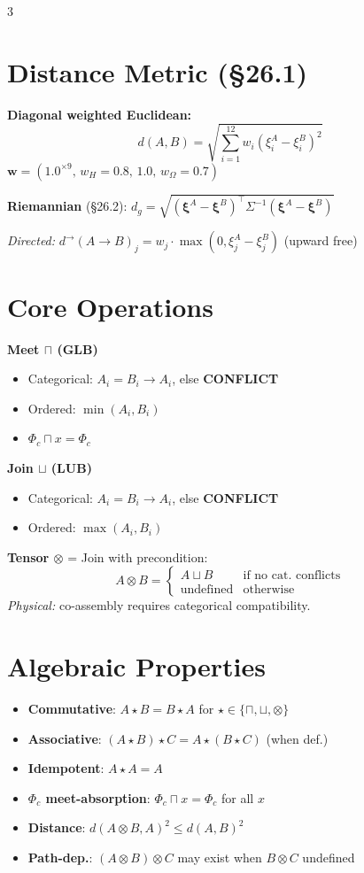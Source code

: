 \documentclass[8pt,a4paper,landscape]{article}
\newcommand{\spec}[1]{\textcolor{specpurple}{#1}}
\newcommand{\conf}{\textcolor{confred}{\textbf{CONFLICT}}}
\begin{document}
\begin{multicols}{3}
\section*{Distance Metric (\S26.1)}
\footnotesize
\textbf{Diagonal weighted Euclidean:}
$$d(A,B)=\sqrt{\sum_{i=1}^{12}w_i(\xi_i^A-\xi_i^B)^2}$$
$\mathbf{w}=(1.0^{\times 9},\,w_H{=}0.8,\,1.0,\,w_\Omega{=}0.7)$

\vspace{0.5em}
\textbf{Riemannian} (\S26.2): $d_g=\sqrt{(\boldsymbol{\xi}^A-\boldsymbol{\xi}^B)^\top\Sigma^{-1}(\boldsymbol{\xi}^A-\boldsymbol{\xi}^B)}$

\textit{Directed:} $d^\to(A\to B)_j = w_j\cdot\max(0,\xi_j^A-\xi_j^B)$ (upward free)

\section*{Core Operations}
\footnotesize
\textbf{Meet $\sqcap$ (GLB)}
\begin{itemize}[leftmargin=*,nosep,label={},topsep=4pt,itemsep=2pt]
\item Categorical: $A_i=B_i\to A_i$, else \conf
\item Ordered: $\min(A_i,B_i)$
\item \spec{$\Phi_c\sqcap x=\Phi_c$}
\end{itemize}

\textbf{Join $\sqcup$ (LUB)}
\begin{itemize}[leftmargin=*,nosep,label={},topsep=4pt,itemsep=2pt]
\item Categorical: $A_i=B_i\to A_i$, else \conf
\item Ordered: $\max(A_i,B_i)$
\end{itemize}

\textbf{Tensor $\otimes$} = Join with precondition:
$$A\otimes B = \begin{cases} A\sqcup B & \text{if no cat. conflicts} \\ \text{undefined} & \text{otherwise} \end{cases}$$
\textit{Physical:} co-assembly requires categorical compatibility.

\section*{Algebraic Properties}
\footnotesize
\begin{itemize}[leftmargin=*,nosep,topsep=4pt,itemsep=2pt]
\item \textbf{Commutative}: $A\star B = B\star A$ for $\star\in\{\sqcap,\sqcup,\otimes\}$
\item \textbf{Associative}: $(A\star B)\star C = A\star(B\star C)$ (when def.)
\item \textbf{Idempotent}: $A\star A = A$
\item \textbf{$\Phi_c$ meet-absorption}: $\Phi_c\sqcap x=\Phi_c$ for all $x$
\item \textbf{Distance}: $d(A\otimes B, A)^2 \leq d(A,B)^2$
\item \textbf{Path-dep.}: $(A\otimes B)\otimes C$ may exist when $B\otimes C$ undefined
\end{itemize}


\end{multicols}
\end{document}
